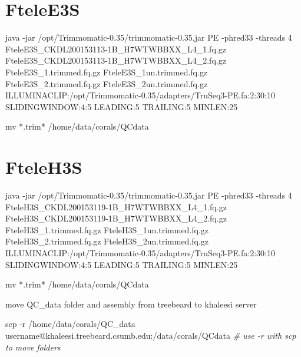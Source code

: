 \documentclass[]{article}
\newenvironment{Shaded}{\begin{snugshade}}{\end{snugshade}}
\newcommand{\CommentTok}[1]{\textcolor[rgb]{0.56,0.35,0.01}{\textit{#1}}}
\newcommand{\ExtensionTok}[1]{#1}
\newcommand{\FunctionTok}[1]{\textcolor[rgb]{0.00,0.00,0.00}{#1}}
\newcommand{\NormalTok}[1]{#1}
\begin{document}
\hypertarget{ftelee3s}{%
\section{FteleE3S}\label{ftelee3s}}

\begin{Shaded}
\begin{Highlighting}[]
\ExtensionTok{java}\NormalTok{ -jar /opt/Trimmomatic-0.35/trimmomatic-0.35.jar PE -phred33 -threads 4 FteleE3S_CKDL200153113-1B_H7WTWBBXX_L4_1.fq.gz FteleE3S_CKDL200153113-1B_H7WTWBBXX_L4_2.fq.gz FteleE3S_1.trimmed.fq.gz FteleE3S_1un.trimmed.fq.gz FteleE3S_2.trimmed.fq.gz FteleE3S_2un.trimmed.fq.gz ILLUMINACLIP:/opt/Trimmomatic-0.35/adapters/TruSeq3-PE.fa:2:30:10 SLIDINGWINDOW:4:5 LEADING:5 TRAILING:5 MINLEN:25}

\FunctionTok{mv}\NormalTok{ *.trim* /home/data/corals/QCdata}
\end{Highlighting}
\end{Shaded}

\hypertarget{fteleh3s}{%
\section{FteleH3S}\label{fteleh3s}}

\begin{Shaded}
\begin{Highlighting}[]
\ExtensionTok{java}\NormalTok{ -jar /opt/Trimmomatic-0.35/trimmomatic-0.35.jar PE -phred33 -threads 4 FteleH3S_CKDL200153119-1B_H7WTWBBXX_L4_1.fq.gz FteleH3S_CKDL200153119-1B_H7WTWBBXX_L4_2.fq.gz FteleH3S_1.trimmed.fq.gz FteleH3S_1un.trimmed.fq.gz FteleH3S_2.trimmed.fq.gz FteleH3S_2un.trimmed.fq.gz ILLUMINACLIP:/opt/Trimmomatic-0.35/adapters/TruSeq3-PE.fa:2:30:10 SLIDINGWINDOW:4:5 LEADING:5 TRAILING:5 MINLEN:25}

\FunctionTok{mv}\NormalTok{ *.trim* /home/data/corals/QCdata}
\end{Highlighting}
\end{Shaded}

move QC\_data folder and assembly from treebeard to khaleesi server

\begin{Shaded}
\begin{Highlighting}[]
\FunctionTok{scp}\NormalTok{ -r /home/data/corals/QC_data username@khaleesi.treebeard.csumb.edu:/data/corals/QCdata }\CommentTok{# use -r with scp to move folders}
\end{Highlighting}
\end{Shaded}
\end{document}
